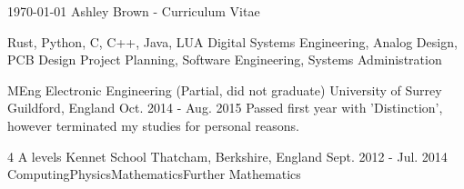 \documentclass[11pt, a4paper]{awesome-cv}
\begin{document}
\makecvheader

\makecvfooter
  {\today}
  {Ashley Brown - Curriculum Vitae}
  {\thepage}


\begin{cvskills}
  {Rust, Python, C, C++, Java, LUA}
  {Digital Systems Engineering, Analog Design, PCB Design}
  {Project Planning, Software Engineering, Systems Administration}
\end{cvskills}

\begin{cventries}
  \cventry
    {MEng Electronic Engineering (Partial, did not graduate)} %
    {University of Surrey} %
    {Guildford, England} %
    {Oct. 2014 - Aug. 2015} %
    {
      Passed first year with 'Distinction', however terminated my studies for personal reasons.
    }
    
  \cventry
    {4 A levels} %
    {Kennet School} %
    {Thatcham, Berkshire, England} %
    {Sept. 2012 - Jul. 2014} %
    {
      Computing{\enskip\cdotp\enskip}Physics{\enskip\cdotp\enskip}Mathematics{\enskip\cdotp\enskip}Further Mathematics
    }
\end{cventries}
\end{document}
